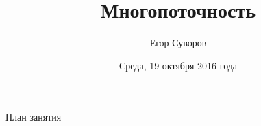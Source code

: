 \documentclass[utf8,xcolor=table]{beamer}
\title{Многопоточность}
\author{Егор Суворов}
\institute[СПб АУ]{Курс <<Парадигмы и языки программирования>>, подгруппа 3}
\date[19.10.2016]{Среда, 19 октября 2016 года}
\begin{document}
\begin{frame}
\titlepage
\end{frame}

\begin{frame}{План занятия}
	\tableofcontents
\end{frame}




\end{document}
